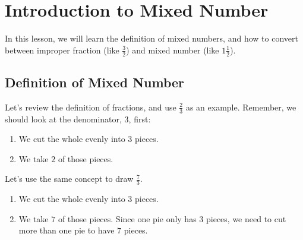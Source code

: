 
\section{Introduction to Mixed Number}

In this lesson, we will learn the definition of mixed numbers, and how to convert between improper fraction (like $\frac{3}{2}$) and mixed number (like $1 \frac{1}{2}$).

\subsection{Definition of Mixed Number}

Let's review the definition of fractions, and use $\frac{2}{3}$ as an example. Remember, we should look at the denominator, $3$, first:
\begin{enumerate}
\item We cut the whole evenly into $3$ pieces.
\item We take $2$ of those pieces.
\end{enumerate}

\begin{center}
\end{center}

Let's use the same concept to draw $\frac{7}{3}$.
\begin{enumerate}
\item We cut the whole evenly into $3$ pieces.
\item We take $7$ of those pieces. Since one pie only has $3$ pieces, we need to cut more than one pie to have $7$ pieces.
\end{enumerate}

